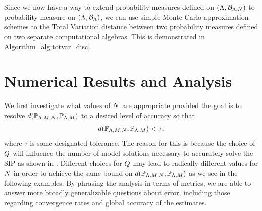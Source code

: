 Since we now have a way to extend probability measures defined on $({\Lambda}, \mathcal{B}_{{\Lambda}, N})$ to  probability measure on $({\Lambda}, \mathcal{B}_{{\Lambda}})$, we can use simple Monte Carlo approximation schemes to the Total Variation distance between two probability measures defined on two separate computational algebras.
This is demonstrated in Algorithm~\ref{alg:totvar_disc}.


%
\section{Numerical Results and Analysis}\label{sec:ch03-examples}
%
%
We first investigate what values of $N$ are appropriate provided the goal is to resolve $d(\mathbb{P}_{{\Lambda}, M, N}, \mathbb{P}_{{\Lambda}, M})$ to a desired level of accuracy so that
\begin{equation}\label{eq:newobjective}
d(\mathbb{P}_{{\Lambda}, M, N}, \mathbb{P}_{{\Lambda},M}) < \tau,
\end{equation}
where $\tau$ is some designated tolerance.
%
%
The reason for this is because the choice of $Q$ will influence the number of model solutions necessary to accurately solve the SIP as shown in \cite{BGE+15}.
Different choices for $Q$ may lead to radically different values for $N$ in order to achieve the same bound on $d(\mathbb{P}_{{\Lambda}, M, N}, \mathbb{P}_{{\Lambda}, M})$ as we see in the following examples.
By phrasing the analysis in terms of metrics, we are able to answer more broadly generalizable questions about error, including those regarding convergence rates and global accuracy of the estimates.







